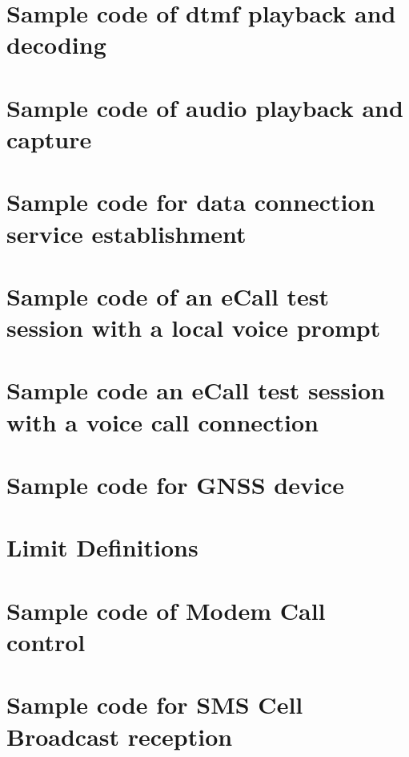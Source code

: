 \documentclass[twoside]{book}
\newcommand{\+}{\discretionary{\mbox{\scriptsize$\hookleftarrow$}}{}{}}
\begin{document}
\chapter{Sample code of dtmf playback and decoding}
\label{c_audiodtmf}
\hypertarget{c_audiodtmf}{}

\chapter{Sample code of audio playback and capture}
\label{c_audioCapturePlayback}
\hypertarget{c_audioCapturePlayback}{}

\chapter{Sample code for data connection service establishment}
\label{c_dataConnectionServiceSample}
\hypertarget{c_dataConnectionServiceSample}{}

\chapter{Sample code of an e\+Call test session with a local voice prompt}
\label{c_ecallWPromptSample}
\hypertarget{c_ecallWPromptSample}{}

\chapter{Sample code an e\+Call test session with a voice call connection}
\label{c_ecallWVoiceSample}
\hypertarget{c_ecallWVoiceSample}{}

\chapter{Sample code for G\+N\+SS device}
\label{c_gnssSampleCode}
\hypertarget{c_gnssSampleCode}{}

\chapter{Limit Definitions}
\label{c_limit}
\hypertarget{c_limit}{}

\chapter{Sample code of Modem Call control}
\label{c_mccTest}
\hypertarget{c_mccTest}{}

\chapter{Sample code for S\+MS Cell Broadcast reception}
\label{c_smsCbSample}
\hypertarget{c_smsCbSample}{}

\end{document}
